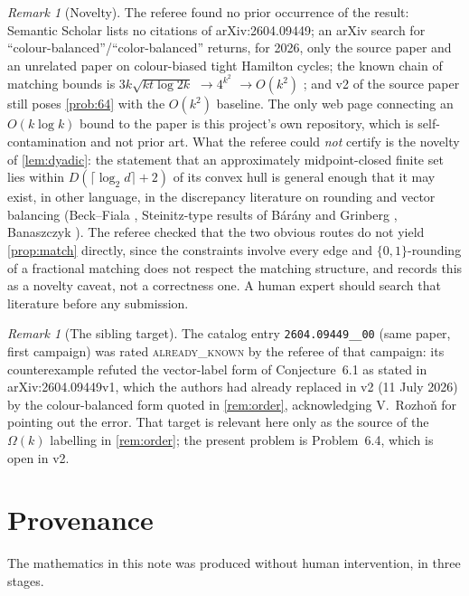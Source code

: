 \documentclass[11pt,a4paper]{article}
\theoremstyle{plain}
\theoremstyle{definition}
\theoremstyle{remark}
\newtheorem{remark}[theorem]{Remark}
\begin{document}
\begin{remark}[Novelty]\label{rem:novelty}
The referee found no prior occurrence of the result: Semantic Scholar lists no citations of arXiv:2604.09449; an arXiv search for ``colour-balanced''/``color-balanced'' returns, for 2026, only the source paper and an unrelated paper on colour-biased tight Hamilton cycles; the known chain of matching bounds is $3k\sqrt{kt\log2k}$ \cite{PR22} $\to4^{k^2}$ \cite{Hol25} $\to O(k^2)$ \cite{HST26}; and v2 of the source paper still poses \cref{prob:64} with the $O(k^2)$ baseline. The only web page connecting an $O(k\log k)$ bound to the paper is this project's own repository, which is self-contamination and not prior art. What the referee could \emph{not} certify is the novelty of \cref{lem:dyadic}: the statement that an approximately midpoint-closed finite set lies within $D(\lceil\log_2d\rceil+2)$ of its convex hull is general enough that it may exist, in other language, in the discrepancy literature on rounding and vector balancing (Beck--Fiala \cite{BeckFiala81}, Steinitz-type results of Bárány and Grinberg \cite{BaranyGrinberg81}, Banaszczyk \cite{Banaszczyk98}). The referee checked that the two obvious routes do not yield \cref{prop:match} directly, since the constraints involve every edge and $\{0,1\}$-rounding of a fractional matching does not respect the matching structure, and records this as a novelty caveat, not a correctness one. A human expert should search that literature before any submission.
\end{remark}

\begin{remark}[The sibling target]\label{rem:sibling}
The catalog entry \texttt{2604.09449\_\_00} (same paper, first campaign) was rated \textsc{already\_known} by the referee of that campaign: its counterexample refuted the vector-label form of Conjecture~6.1 as stated in arXiv:2604.09449v1, which the authors had already replaced in v2 (11 July 2026) by the colour-balanced form quoted in \cref{rem:order}, acknowledging V.~Rozhoň for pointing out the error. That target is relevant here only as the source of the $\Omega(k)$ labelling in \cref{rem:order}; the present problem is Problem~6.4, which is open in v2.
\end{remark}

\section{Provenance}\label{sec:provenance}

The mathematics in this note was produced without human intervention, in three stages.
\end{document}
